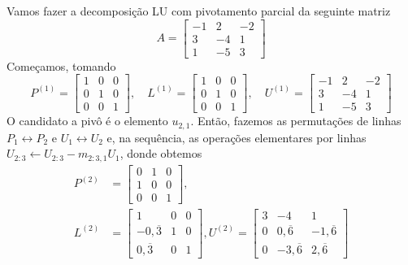 \begin{ex}
  Vamos fazer a decomposição LU com pivotamento parcial da seguinte matriz
  \begin{equation}
    A = \begin{bmatrix}
      -1 & 2 & -2\\
      3 & -4 & 1\\
      1 & -5 & 3
    \end{bmatrix}
  \end{equation}
  Começamos, tomando
  \begin{equation}
    P^{(1)} =
    \begin{bmatrix}
      1 & 0 & 0\\
      0 & 1 & 0\\
      0 & 0 & 1
    \end{bmatrix},\quad
    L^{(1)} =
    \begin{bmatrix}
      1 & 0 & 0\\
      0 & 1 & 0\\
      0 & 0 & 1      
    \end{bmatrix},\quad
    U^{(1)} = 
    \begin{bmatrix}
      -1 & 2 & -2\\
      3 & -4 & 1\\
      1 & -5 & 3
    \end{bmatrix}
  \end{equation}
  O candidato a pivô é o elemento $u_{2,1}$. Então, fazemos as permutações de linhas $P_1\leftrightarrow P_2$ e $U_1\leftrightarrow U_2$ e, na sequência, as operações elementares por linhas $U_{2:3}\leftarrow U_{2:3}-m_{2:3,1}U_1$, donde obtemos
  \begin{align}
    P^{(2)} &=
    \begin{bmatrix}
      0 & 1 & 0\\
      1 & 0 & 0\\
      0 & 0 & 1
    \end{bmatrix},\\
    L^{(2)} &=
    \begin{bmatrix}
      1 & 0 & 0\\
      -0,\overline{3} & 1 & 0\\
      0,\overline{3} & 0 & 1      
    \end{bmatrix},
    U^{(2)} = 
    \begin{bmatrix}
      3 & -4 & 1\\
      0 & 0,\overline{6} & -1,\overline{6}\\
      0 & -3,\overline{6} & 2,\overline{6}

\end{bmatrix}
\end{align}
\end{ex}
